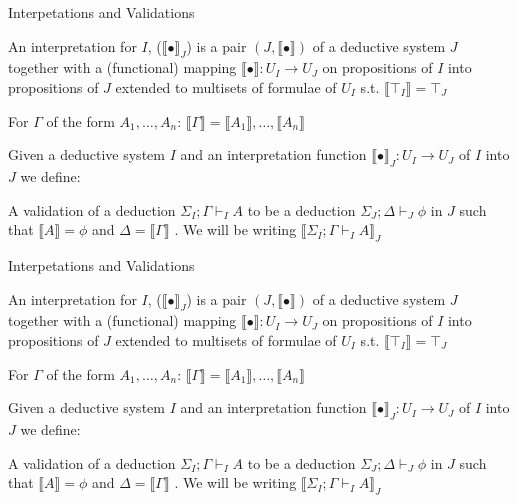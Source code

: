 \documentclass{beamer}
\begin{document}
\begin{frame}{Interpetations and Validations}
  
  \begin{outline}
  \1An interpretation for $I$, ($\llbracket\bullet \rrbracket_J$) is a pair $(J,\llbracket\bullet\rrbracket)$ of a deductive system $J$ together with a (functional) mapping $\llbracket \bullet \rrbracket: U_I\rightarrow U_J$ on propositions of $I$ into propositions of $J$ extended to multisets of formulae of $U_I$ s.t.
  \2 $\llbracket\top_I \rrbracket = \top_J$
  
  \2 For $\Gamma$ of the form $A_1,\ldots, A_n$: $\llbracket\Gamma \rrbracket=\llbracket A_1 \rrbracket,\ldots, \llbracket A_n\rrbracket$
  
  \1 Given a deductive system $I$ and an interpretation function $\llbracket\bullet\rrbracket_J:U_I\rightarrow U_J$ of $I$ into $J$ we define:
  
  \2 A validation of a deduction $\Sigma_I;\Gamma\vdash_I A$ to be a deduction $\Sigma_J;\Delta\vdash_{J} \phi$ in $J$ such that $\llbracket A \rrbracket=\phi$ and $\Delta=\llbracket \Gamma \rrbracket $ . We will be writing $ \llbracket \Sigma_I;\Gamma\vdash_I A\rrbracket_J$
  \end{outline}
\end{frame}
\begin{frame}{Interpetations and Validations}
  
  \begin{outline}
  \1An interpretation for $I$, ($\llbracket\bullet \rrbracket_J$) is a pair $(J,\llbracket\bullet\rrbracket)$ of a deductive system $J$ together with a (functional) mapping $\llbracket \bullet \rrbracket: U_I\rightarrow U_J$ on propositions of $I$ into propositions of $J$ extended to multisets of formulae of $U_I$ s.t.
  \2 $\llbracket\top_I \rrbracket = \top_J$
  
  \2 For $\Gamma$ of the form $A_1,\ldots, A_n$: $\llbracket\Gamma \rrbracket=\llbracket A_1 \rrbracket,\ldots, \llbracket A_n\rrbracket$
  
  \1 Given a deductive system $I$ and an interpretation function $\llbracket\bullet\rrbracket_J:U_I\rightarrow U_J$ of $I$ into $J$ we define:
  
  \2 A validation of a deduction $\Sigma_I;\Gamma\vdash_I A$ to be a deduction $\Sigma_J;\Delta\vdash_{J} \phi$ in $J$ such that $\llbracket A \rrbracket=\phi$ and $\Delta=\llbracket \Gamma \rrbracket $ . We will be writing $ \llbracket \Sigma_I;\Gamma\vdash_I A\rrbracket_J$
  \end{outline}
\end{frame}
\end{document}
